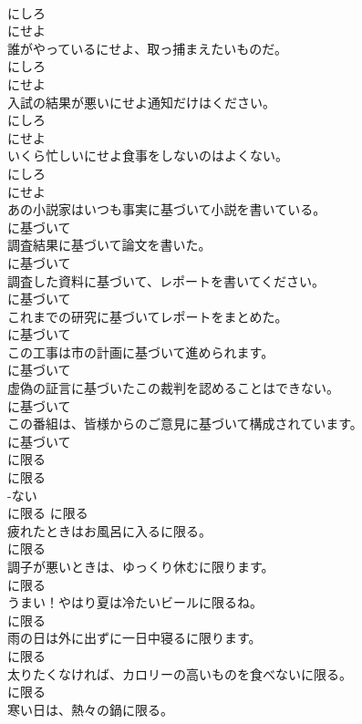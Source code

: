 \documentclass[8pt]{extreport}
\begin{document}
\begin{CJK}{UTF8}{min}
\\	にしろ 
\\	にせよ
\\	誰がやっているにせよ、取っ捕まえたいものだ。	
\\	にしろ 
\\	にせよ
\\	入試の結果が悪いにせよ通知だけはください。	
\\	にしろ 
\\	にせよ
\\	いくら忙しいにせよ食事をしないのはよくない。	
\\	にしろ 
\\	にせよ
\\	あの小説家はいつも事実に基づいて小説を書いている。	
\\	に基づいて
\\	調査結果に基づいて論文を書いた。	
\\	に基づいて
\\	調査した資料に基づいて、レポートを書いてください。	
\\	に基づいて
\\	これまでの研究に基づいてレポートをまとめた。	
\\	に基づいて
\\	この工事は市の計画に基づいて進められます。	
\\	に基づいて
\\	虚偽の証言に基づいたこの裁判を認めることはできない。	
\\	に基づいて
\\	この番組は、皆様からのご意見に基づいて構成されています。	
\\	に基づいて
\\	に限る	
\\	に限る	
\\	-ない
\\	に限る	に限る
\\	疲れたときはお風呂に入るに限る。	
\\	に限る
\\	調子が悪いときは、ゆっくり休むに限ります。	
\\	に限る
\\	うまい！やはり夏は冷たいビールに限るね。	
\\	に限る
\\	雨の日は外に出ずに一日中寝るに限ります。	
\\	に限る
\\	太りたくなければ、カロリーの高いものを食べないに限る。	
\\	に限る
\\	寒い日は、熱々の鍋に限る。	

\end{CJK}
\end{document}
